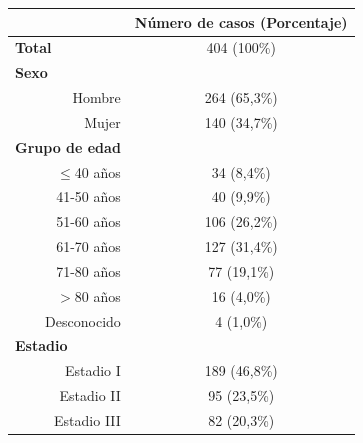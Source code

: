 \begin{table}[H]
	\centering
	\begin{tabular}{rc}
		\cline{2-2}
		\multicolumn{1}{l}{}                           & \multicolumn{1}{c}{\textbf{Número de casos (Porcentaje)}} \\ \hline
		\multicolumn{1}{l}{\textbf{Total}} & 404 (100\%)                                      \\ \hline
		\multicolumn{1}{l}{\textbf{Sexo}}              &                                                  \\
		Hombre                                         & 264 (65,3\%)                                     \\
		Mujer                                          & 140 (34,7\%)                                     \\ \hline
		\multicolumn{1}{l}{\textbf{Grupo de edad}}     &                                                  \\
		$\leq$40 años                                      & 34 (8,4\%)                                       \\
		41-50 años                                     & 40 (9,9\%)                                       \\
		51-60 años                                     & 106 (26,2\%)                                     \\
		61-70 años                                     & 127 (31,4\%)                                     \\
		71-80 años                                     & 77 (19,1\%)                                      \\
		$>$80 años                                       & 16 (4,0\%)                                         \\
		Desconocido                                    & 4 (1,0\%)                                          \\ \hline
		\multicolumn{1}{l}{\textbf{Estadio}}           &                                                  \\
		Estadio I                                      & 189 (46,8\%)                                     \\
		Estadio II                                     & 95 (23,5\%)                                      \\
		Estadio III                                    & 82 (20,3\%)                                      \\

\end{tabular}
\end{table}
